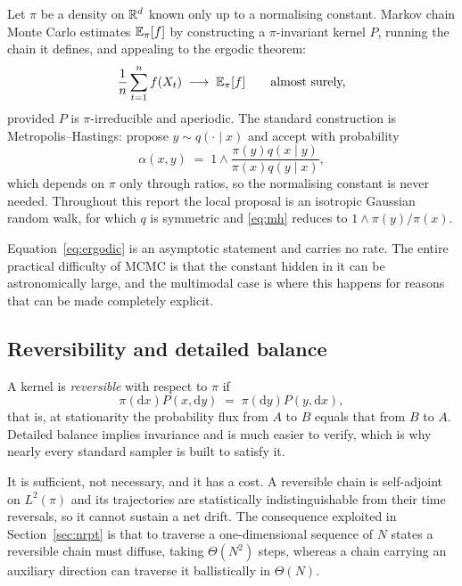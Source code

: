 Let $\pi$ be a density on $\mathbb{R}^d$ known only up to a normalising constant. Markov
chain Monte Carlo estimates $\mathbb{E}_\pi[f]$ by constructing a $\pi$-invariant kernel
$P$, running the chain it defines, and appealing to the ergodic theorem:
\begin{equation}
  \frac1n\sum_{t=1}^n f(X_t)\;\longrightarrow\;\mathbb{E}_\pi[f]
  \qquad\text{almost surely,}
  \label{eq:ergodic}
\end{equation}
provided $P$ is $\pi$-irreducible and aperiodic. The standard construction is
Metropolis--Hastings: propose $y\sim q(\cdot\mid x)$ and accept with probability
\begin{equation}
  \alpha(x,y)\;=\;1\wedge\frac{\pi(y)q(x\mid y)}{\pi(x)q(y\mid x)} ,
  \label{eq:mh}
\end{equation}
which depends on $\pi$ only through ratios, so the normalising constant is never
needed. Throughout this report the local proposal is an isotropic Gaussian random
walk, for which $q$ is symmetric and \eqref{eq:mh} reduces to
$1\wedge\pi(y)/\pi(x)$.

Equation~\eqref{eq:ergodic} is an asymptotic statement and carries no rate. The
entire practical difficulty of MCMC is that the constant hidden in it can be
astronomically large, and the multimodal case is where this happens for reasons
that can be made completely explicit.

\subsection{Reversibility and detailed balance}

A kernel is \emph{reversible} with respect to $\pi$ if
\begin{equation}
  \pi(\mathrm dx)P(x,\mathrm dy)\;=\;\pi(\mathrm dy)P(y,\mathrm dx),
  \label{eq:db}
\end{equation}
that is, at stationarity the probability flux from $A$ to $B$ equals that from
$B$ to $A$. Detailed balance implies invariance and is much easier to verify,
which is why nearly every standard sampler is built to satisfy it.

It is sufficient, not necessary, and it has a cost. A reversible chain is
self-adjoint on $L^2(\pi)$ and its trajectories are statistically
indistinguishable from their time reversals, so it cannot sustain a net drift.
The consequence exploited in Section~\ref{sec:nrpt} is that to traverse a
one-dimensional sequence of $N$ states a reversible chain must diffuse, taking
$\Theta(N^2)$ steps, whereas a chain carrying an auxiliary direction can traverse
it ballistically in $\Theta(N)$.

